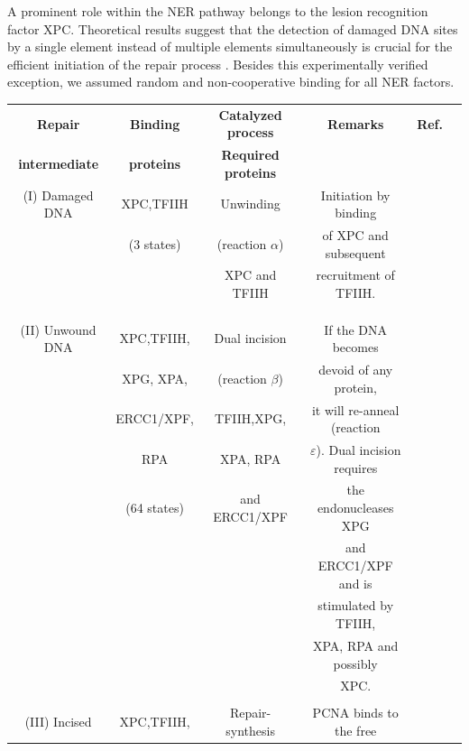 A prominent role within the NER pathway belongs to the lesion recognition factor XPC. Theoretical results suggest that the detection of damaged DNA sites by a single element instead of multiple elements simultaneously is crucial for the efficient initiation of the repair process \cite{Politi2005,Volker2001}. Besides this experimentally verified exception, we assumed random and non-cooperative binding for all NER factors.\\ 
\begin{table}[t!]
	\small{
		\begin{tabular}{cccccc}
			\hline
			\rule{0pt}{2ex}
			\textbf{Repair}&\textbf{Binding} &	\textbf{Catalyzed  process}&\textbf{Remarks}  	&\textbf{Ref.} \\ 
			\textbf{intermediate}&	\textbf{proteins} &	\textbf{Required proteins}&	& \\ \hline
			\rule{0pt}{3ex}
			(I) Damaged DNA&	XPC,TFIIH 	&Unwinding &Initiation by binding	&\cite{Evans1997a}
			\\ 
			&	(3 states)& (reaction $\alpha$)&  of XPC and subsequent &\cite{Riedl2003}\\
			&&XPC and TFIIH&	 recruitment of TFIIH. &\cite{Yokoi:2000:J-Biol-Chem:10734143}\\ 
			&&&&\cite{Rademakers2003}\\ 
			&&&& \cite{Volker2001} \\ 
			&&&&\\\hline
			\rule{0pt}{3ex}
			(II) Unwound DNA&XPC,TFIIH,&Dual incision &If the DNA becomes &\cite{Evans1997a} \\
			& XPG, XPA,&(reaction $\beta$)&devoid of any protein,&\cite{ODonovan:1994:Nature:8090225}\\
			&ERCC1/XPF,&TFIIH,XPG,&it will re-anneal (reaction &\cite{Sijbers:1996:Cell:8797827}\\
			&  RPA& XPA,  RPA&$\varepsilon$). Dual incision requires&\cite{Winkler2001}\\
			&(64 states)&and ERCC1/XPF&the endonucleases XPG& \cite{deLaat:1998:Genes-Dev:9716411}\\
			&&&  and ERCC1/XPF and is&\\
			&&&stimulated by TFIIH, &\\
			&&&XPA, RPA and possibly &\\
			&&&XPC.&\\
			&&&& \\ \hline
			\rule{0pt}{3ex}
			(III) Incised&XPC,TFIIH,&Repair-synthesis&PCNA binds to the free&\cite{Evans1997a}\\

\end{tabular}}
\end{table}
